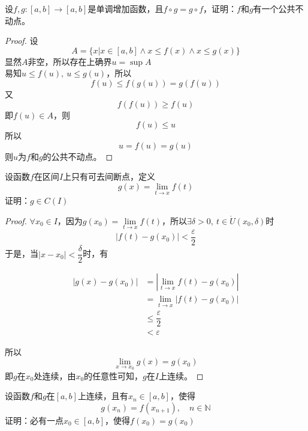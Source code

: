\begin{proposition}

    设$f,g :[a,b] \to [a,b]$是单调增加函数，且$f \circ g = g \circ f$，证明：$f$和$g$有一个公共不动点。

\end{proposition}

\begin{proof}

    设
    $$A = \{x| x \in [a,b] \land x \leq f(x) \land x \leq g(x)\}$$
    显然$A$非空，所以存在上确界$ u = \sup{A}$\\
    易知$u \leq f(u),\ u \leq g(u)$，所以            
    $$f(u) \leq f(g(u)) = g(f(u))$$ 
    又
    $$f(f(u)) \geq f(u)$$
    即$f(u) \in A$，则
    $$f(u) \leq u$$
    所以
    $$u =f(u) = g(u)$$
    则$u$为$f$和$g$的公共不动点。

\end{proof}

\begin{proposition}
    
    设函数$f$在区间$I$上只有可去间断点，定义
    $$g(x) = \lim_{t\to x}{f(t)}$$
    证明：$g \in C(I)$

\end{proposition}

\begin{proof}

    $\forall x_0 \in I$，因为$g(x_0) = \lim\limits_{t\to x}{f(t)}$，所以$\exists \delta > 0, \ t \in \mathring{U}(x_0, \delta)$时
    $$|f(t) - g(x_0)| < \dfrac{\varepsilon}{2}$$
    于是，当$|x - x_0| < \dfrac{\delta}{2}$时，有

    \begin{align*}
        |g(x) - g(x_0)| & = |\lim_{t\to x}{f(t) - g(x_0)}| \\
        & = \lim_{t\to x}{|f(t) - g(x_0)|} \\
        & \leq \dfrac{\varepsilon}{2} \\
        & < \varepsilon 
    \end{align*}

    所以
    $$\lim_{x\to x_0}{g(x)} = g(x_0)$$
    即$g$在$x_0$处连续，由$x_0$的任意性可知，$g$在$I$上连续。

\end{proof}

\begin{proposition}

    设函数$f$和$g$在$[a,b]$上连续，且有$x_n \in [a,b]$，使得
    $$g(x_n) = f(x_{n+1}), \quad n \in \mathbb{N}$$
    证明：必有一点$x_0 \in [a,b]$，使得$f(x_0) = g(x_0)$

\end{proposition}

